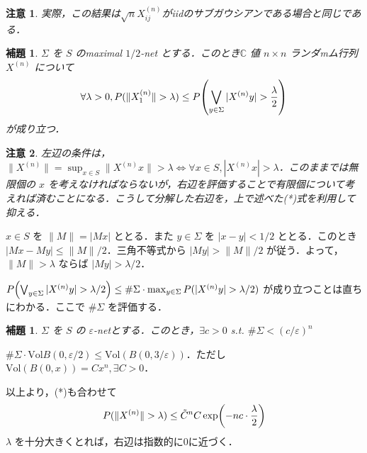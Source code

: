 \documentclass{ltjsarticle}
\makeatletter
\theoremstyle{mystyle1}
\newtheorem{lem}[dfn]{補題}
\theoremstyle{mystyle2}
\newtheorem{note*}{注意}
\theoremstyle{mystyle3}
\renewenvironment{proof}[1][\proofname]{\par
  \pushQED{\qed}%
  \normalfont
  \topsep6\p@\@plus6\p@ \trivlist
  \item[\hskip\labelsep{\bfseries\sffamily #1}]\ignorespaces
}{%
  \popQED\endtrivlist\@endpefalse
}
\renewcommand\proofname{証明}
\makeatother
\begin{document}
\begin{note*}
    実際，この結果は$\sqrt{n}X_{ij}^{(n)}$がiidのサブガウシアンである場合と同じである．
\end{note*}

\begin{lem}
    $\Sigma$ を $S$ のmaximal $1/2$-net とする．このとき$\mathbb{C}$ 値 $n\times n$ ランダmム行列 $X^{(n)}$ について%
    \begin{equation}
        \forall\lambda>0,P(\|X_1^{(n)}\|>\lambda)\leq P\mleft(\bigvee_{y\in\Sigma}|X^{(n)}y|>\frac{\lambda}{2}\mright)
    \end{equation}
    が成り立つ．
\end{lem}

\begin{note*}
    左辺の条件は，$\|X^{(n)}\|=\sup_{x\in S}\|X^{(n)}x\|>\lambda\Leftrightarrow \forall x\in S,|X^{(n)}x|>\lambda$．このままでは無限個の $x$ を考えなければならないが，右辺を評価することで有限個について考えれば済むことになる．こうして分解した右辺を，上で述べた(*)式を利用して抑える．
\end{note*}
\begin{proof}
    $x\in S$ を $\|M\|=|Mx|$ ととる．また $y\in\Sigma$ を $|x-y|<1/2$ ととる．このとき $|Mx-My|\leq\|M\|/2$．三角不等式から $|My|>\|M\|/2$ が従う．よって， $\|M\|>\lambda$ ならば $|My|>\lambda/2$．
\end{proof}

$P\mleft(\bigvee_{y\in\Sigma}|X^{(n)}y|>\lambda/2\mright)\leq\#\Sigma\cdot\max_{y\in\Sigma}P(|X^{(n)}y|>\lambda/2)$ が成り立つことは直ちにわかる．ここで $\#\Sigma$ を評価する．

\begin{lem}
    $\Sigma$ を $S$ の $\varepsilon$-netとする．このとき，$\exists c>0$ s.t. $\#\Sigma <(c/\varepsilon)^n$
\end{lem}

\begin{proof}
    $\#\Sigma\cdot\mathrm{Vol} B(0,\varepsilon/2)\leq\mathrm{Vol}(B(0,3/\varepsilon))$．ただし $\mathrm{Vol}(B(0,x))=Cx^n,\exists C>0$．
\end{proof}

以上より，(*)も合わせて
\begin{equation}
    P(\|X^{(n)}\|>\lambda)\leq\tilde{C}^n C\exp\mleft(-nc\cdot\frac{\lambda}{2}\mright)
\end{equation}
$\lambda$ を十分大きくとれば，右辺は指数的に0に近づく．
\end{document}

